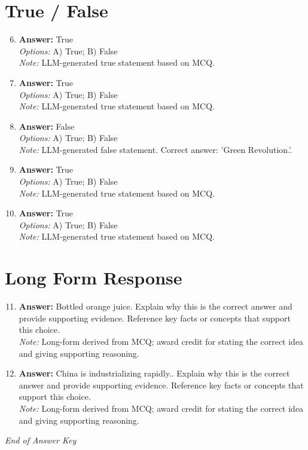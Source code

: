 \documentclass[12pt]{article}
\begin{document}
\section*{True / False}
\begin{enumerate}[label=\arabic*.]
\setcounter{enumi}{5}
\item \textbf{Answer:} True
\\ \textit{Options:} A) True; B) False
\\ \textit{Note:} LLM-generated true statement based on MCQ.
\item \textbf{Answer:} True
\\ \textit{Options:} A) True; B) False
\\ \textit{Note:} LLM-generated true statement based on MCQ.
\item \textbf{Answer:} False
\\ \textit{Options:} A) True; B) False
\\ \textit{Note:} LLM-generated false statement. Correct answer: 'Green Revolution.'.
\item \textbf{Answer:} True
\\ \textit{Options:} A) True; B) False
\\ \textit{Note:} LLM-generated true statement based on MCQ.
\item \textbf{Answer:} True
\\ \textit{Options:} A) True; B) False
\\ \textit{Note:} LLM-generated true statement based on MCQ.
\end{enumerate}

\section*{Long Form Response}
\begin{enumerate}[label=\arabic*.]
\setcounter{enumi}{10}
\item \textbf{Answer:} Bottled orange juice. Explain why this is the correct answer and provide supporting evidence. Reference key facts or concepts that support this choice.
\\ \textit{Note:} Long-form derived from MCQ; award credit for stating the correct idea and giving supporting reasoning.
\item \textbf{Answer:} China is industrializing rapidly.. Explain why this is the correct answer and provide supporting evidence. Reference key facts or concepts that support this choice.
\\ \textit{Note:} Long-form derived from MCQ; award credit for stating the correct idea and giving supporting reasoning.
\end{enumerate}

\vfill
\noindent\textit{End of Answer Key}
\end{document}
